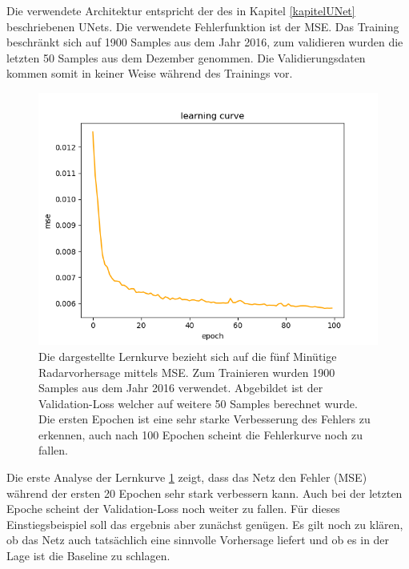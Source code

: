 Die verwendete Architektur entspricht der des in Kapitel \ref{kapitelUNet} beschriebenen UNets. Die verwendete Fehlerfunktion ist der MSE. Das Training beschränkt sich auf 1900 Samples aus dem Jahr 2016, zum validieren wurden die letzten 50 Samples aus dem Dezember genommen. Die Validierungsdaten kommen somit in keiner Weise während des Trainings vor.
\begin{figure}[h]
	\centering
	\includegraphics[width=\linewidth]{pics/mse_learncurve.png}
	\caption[Lernkurve des UNets zur fünf Minuten Vorhersage]{Die dargestellte Lernkurve bezieht sich auf die fünf Minütige Radarvorhersage mittels MSE. Zum Trainieren wurden 1900 Samples aus dem Jahr 2016 verwendet. Abgebildet ist der Validation-Loss welcher auf weitere 50 Samples berechnet wurde. Die ersten Epochen ist eine sehr starke Verbesserung des Fehlers zu erkennen, auch nach 100 Epochen scheint die Fehlerkurve noch zu fallen.}
	\label{mseLC}
\end{figure}

Die erste Analyse der Lernkurve \ref{mseLC} zeigt, dass das Netz den Fehler (MSE) während der ersten 20 Epochen sehr stark verbessern kann. Auch bei der letzten Epoche scheint der Validation-Loss noch weiter zu fallen. Für dieses Einstiegsbeispiel soll das ergebnis aber zunächst genügen. Es gilt noch zu klären, ob das Netz auch tatsächlich eine sinnvolle Vorhersage liefert und ob es in der Lage ist die Baseline zu schlagen. 


